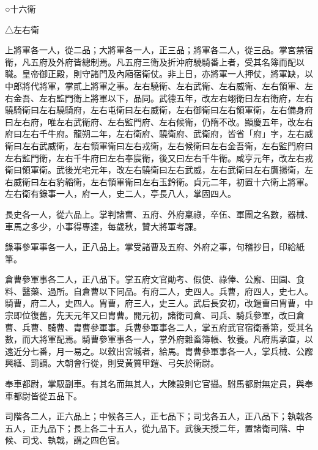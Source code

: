 
\begin{pinyinscope}

 ○十六衛



 △左右衛



 上將軍各一人，從二品；大將軍各一人，正三品；將軍各二人，從三品。掌宮禁宿衛，凡五府及外府皆總制焉。凡五府三衛及折沖府驍騎番上者，受其名簿而配以職。皇帝御正殿，則守諸門及內廂宿衛仗。非上日，亦將軍一人押仗，將軍缺，以中郎將代將軍，掌貳上將軍之事。左右驍衛、左右武衛、左右威衛、左右領軍、左右金吾、左右監門衛上將軍以下，品同。武德五年，改左右翊衛曰左右衛府，左右驍騎衛曰左右驍騎府，左右屯衛曰左右威衛，左右御衛曰左右領軍衛，左右備身府曰左右府，唯左右武衛府、左右監門府、左右候衛，仍隋不改。顯慶五年，改左右府曰左右千牛府。龍朔二年，左右衛府、驍衛府、武衛府，皆省「府」字，左右威衛曰左右武威衛，左右領軍衛曰左右戎衛，左右候衛曰左右金吾衛，左右監門府曰左右監門衛，左右千牛府曰左右奉宸衛，後又曰左右千牛衛。咸亨元年，改左右戎衛曰領軍衛。武後光宅元年，改左右驍衛曰左右武威，左右武衛曰左右鷹揚衛，左右威衛曰左右豹韜衛，左右領軍衛曰左右玉鈐衛。貞元二年，初置十六衛上將軍。左右衛有錄事一人，府一人，史二人，亭長八人，掌固四人。



 長史各一人，從六品上。掌判諸曹、五府、外府稟祿，卒伍、軍團之名數，器械、車馬之多少，小事得專達，每歲秋，贊大將軍考課。



 錄事參軍事各一人，正八品上。掌受諸曹及五府、外府之事，句稽抄目，印給紙筆。



 倉曹參軍事各二人，正八品下。掌五府文官勛考、假使、祿俸、公廨、田園、食料、醫藥、過所。自倉曹以下同品。有府二人，史四人。兵曹，府四人，史七人。騎曹，府二人，史四人。胄曹，府三人，史三人。武后長安初，改鎧曹曰胄曹，中宗即位復舊，先天元年又曰胄曹。開元初，諸衛司倉、司兵、騎兵參軍，改曰倉曹、兵曹、騎曹、胄曹參軍事。兵曹參軍事各二人，掌五府武官宿衛番第，受其名數，而大將軍配焉。騎曹參軍事各一人，掌外府雜畜簿帳、牧養。凡府馬承直，以遠近分七番，月一易之。以敕出宮城者，給馬。胄曹參軍事各一人，掌兵械、公廨興繕、罰謫。大朝會行從，則受黃質甲鎧、弓矢於衛尉。



 奉車都尉，掌馭副車。有其名而無其人，大陳設則它官攝。駙馬都尉無定員，與奉車都尉皆從五品下。



 司階各二人，正六品上；中候各三人，正七品下；司戈各五人，正八品下；執戟各五人，正九品下；長上各二十五人，從九品下。武後天授二年，置諸衛司階、中候、司戈、執戟，謂之四色官。




\end{pinyinscope}
